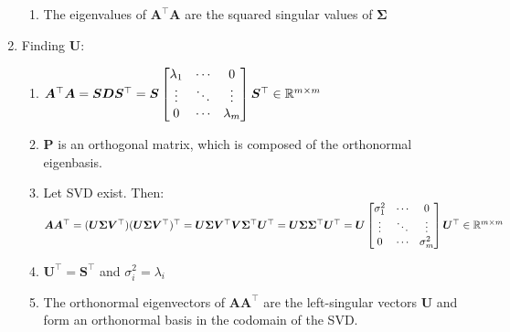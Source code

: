 \begin{enumerate}
\begin{enumerate}
        \item The eigenvalues of $\bm{A}^\top \bm{A}$ are the squared singular values of $\bm{\Sigma}$
        \hfill \cite{mfml/book/mml/Deisenroth-Faisal-Ong}
    \end{enumerate}

    \item Finding $\bm{U}$:
    \begin{enumerate}
        \item $
            \bm{A}^\top \bm{A}
            = \bm{SDS} ^\top
            = \bm{S} \begin{bmatrix}
                \lambda_1 & \cdots & 0 \\
                \vdots & \ddots & \vdots \\
                0 & \cdots & \lambda_m
            \end{bmatrix} \bm{S} ^\top
            \in \mathbb{R}^{m\times m}
        $
        \hfill \cite{mfml/book/mml/Deisenroth-Faisal-Ong}

        \item $\bm{P}$ is an orthogonal matrix, which is composed of the orthonormal eigenbasis.
        \hfill \cite{mfml/book/mml/Deisenroth-Faisal-Ong}

        \item Let SVD exist. Then:
        \hfill \cite{mfml/book/mml/Deisenroth-Faisal-Ong}
        \\
        $
            \bm{A} \bm{A} ^\top
            = (\bm{U\Sigma V}^\top) (\bm{U\Sigma V}^\top) ^\top
            = \bm{U\Sigma V}^\top \bm{V} \bm{\Sigma}^\top \bm{U}^\top
            = \bm{U} \bm{\Sigma} \bm{\Sigma}^\top \bm{U}^\top
            = \bm{U} \begin{bmatrix}
                \sigma_1^2 & \cdots & 0 \\
                \vdots & \ddots & \vdots \\
                0 & \cdots & \sigma_m^2
            \end{bmatrix} \bm{U} ^\top
            \in \mathbb{R}^{m\times m}
        $
        \hfill \cite{mfml/book/mml/Deisenroth-Faisal-Ong}

        \item $\bm{U}^\top = \bm{S}^\top$ and $\sigma^2_i = \lambda_i$
        \hfill \cite{mfml/book/mml/Deisenroth-Faisal-Ong}

        \item The orthonormal eigenvectors of $\bm{AA}^\top$ are the left-singular vectors $\bm{U}$ and form an orthonormal basis in the codomain of the SVD.
        \hfill \cite{mfml/book/mml/Deisenroth-Faisal-Ong}
    \end{enumerate}


\end{enumerate}
